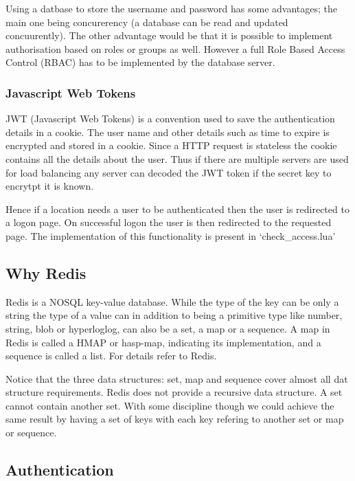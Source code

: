 Using a datbase to store the username and password has some advantages;
the main one being concurerency (a database can be read and updated
concuurently). The other advantage would be that it is possible to
implement authorisation based on roles or groups as well. However a full
Role Based Access Control (RBAC) has to be implemented by the database
server.

\hypertarget{javascript-web-tokens}{%
\subsubsection{Javascript Web Tokens}\label{javascript-web-tokens}}

JWT (Javascript Web Tokens) is a convention used to save the
authentication details in a cookie. The user name and other details such
as time to expire is encrypted and stored in a cookie. Since a HTTP
request is stateless the cookie contains all the details about the user.
Thus if there are multiple servers are used for load balancing any
server can decoded the JWT token if the secret key to encrytpt it is
known.

Hence if a location needs a user to be authenticated then the user is
redirected to a logon page. On successful logon the user is then
redirected to the requested page. The implementation of this
functionality is present in `check\_access.lua'

\hypertarget{why-redis}{%
\subsection{Why Redis}\label{why-redis}}

Redis is a NOSQL key-value database. While the type of the key can be
only a string the type of a value can in addition to being a primitive
type like number, string, blob or hyperloglog, can also be a set, a map
or a sequence. A map in Redis is called a HMAP or hasp-map, indicating
its implementation, and a sequence is called a list. For details refer
to Redis.

Notice that the three data structures: set, map and sequence cover
almost all dat structure requirements. Redis does not provide a
recursive data structure. A set cannot contain another set. With some
discipline though we could achieve the same result by having a set of
keys with each key refering to another set or map or sequence.

\hypertarget{authentication}{%
\subsection{Authentication}\label{authentication}}

